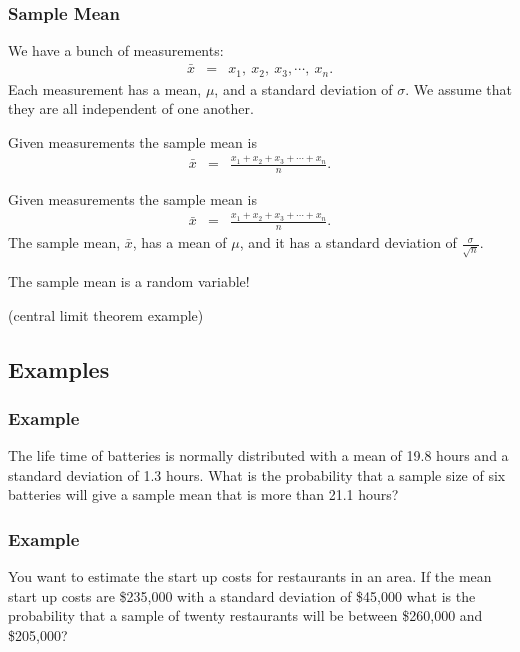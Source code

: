\begin{frame}
  \frametitle{Sample Mean}

  We have a bunch of measurements:
  \begin{eqnarray*}
    \bar{x} & = & x_1,~x_2,~x_3,\cdots,~x_n.
  \end{eqnarray*}
  Each measurement has a mean, $\mu$, and a standard deviation of
  $\sigma$. We assume that they are all independent of one another.
  
  {
    \begin{definition}
      Given measurements the sample mean is 
      \begin{eqnarray*}
        \bar{x} & = & \frac{x_1+x_2+x_3+\cdots+x_n}{n}.
      \end{eqnarray*}
    \end{definition}
  }

  {
    \begin{definition}
      Given measurements the sample mean is 
      \begin{eqnarray*}
        \bar{x} & = & \frac{x_1+x_2+x_3+\cdots+x_n}{n}.
      \end{eqnarray*}
      The sample mean, $\bar{x}$,  has a mean of $\mu$, and it has a
      standard deviation of $\frac{\sigma}{\sqrt{n}}$.
    \end{definition}
  }


  {
    The sample mean is a random variable!
  }

\end{frame}


\begin{frame}
  (central limit theorem example)
\end{frame}



\subsection{Examples}

\begin{frame}
  \frametitle{Example}

  The life time of batteries is normally distributed with a mean of
  19.8 hours and a standard deviation of 1.3 hours. What is the
  probability that a sample size of six batteries will give a sample
  mean that is more than 21.1 hours?

\end{frame}


\begin{frame}
  \frametitle{Example}

  You want to estimate the start up costs for restaurants in an
  area. If the mean start up costs are \$235,000 with a standard
  deviation of \$45,000 what is the probability that a sample of
  twenty restaurants will be between \$260,000 and \$205,000?

\end{frame}


